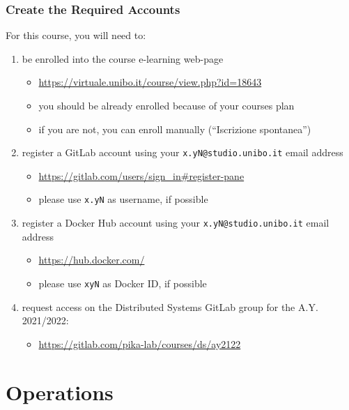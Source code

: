 \documentclass[presentation]{beamer}\mode<presentation>{\usetheme{AMSBolognaFC}}
\begin{document}
\begin{frame}\label{configure-accounts}
\frametitle{Create the Required Accounts}

    For this course, you will need to:
    \begin{enumerate}
        \item be enrolled into the course e-learning web-page
        \begin{itemize}
            \item \url{https://virtuale.unibo.it/course/view.php?id=18643}
            \item you should be already enrolled because of your courses plan
            \item if you are not, you can enroll manually (``Iscrizione spontanea'')
        \end{itemize}

        \item register a GitLab account using your \alert{\texttt{x.yN@studio.unibo.it}} email address
        \begin{itemize}
            \item \url{https://gitlab.com/users/sign_in\#register-pane}
            \item please use \texttt{x.yN} as username, if possible
        \end{itemize}

        \item register a Docker Hub account using your \alert{\texttt{x.yN@studio.unibo.it}} email address
        \begin{itemize}
            \item \url{https://hub.docker.com/}
            \item please use \texttt{xyN} as Docker ID, if possible
        \end{itemize}

        \item request access on the Distributed Systems GitLab group for the A.Y. 2021/2022:
        \begin{itemize}
            \item \url{https://gitlab.com/pika-lab/courses/ds/ay2122}
        \end{itemize}

    \end{enumerate}

\end{frame}

\section{Operations}
\end{document}

